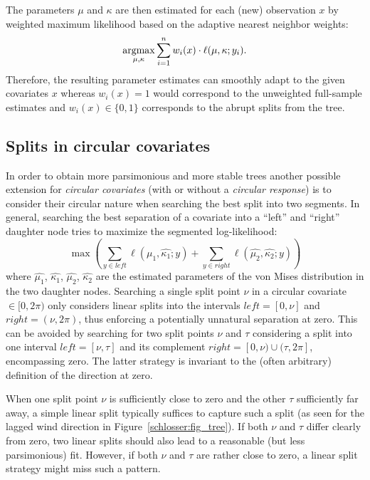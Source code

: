 \documentclass[twoside]{report}
\begin{document}
The parameters $\mu$ and $\kappa$ are then estimated for each (new) 
observation $x$ by weighted maximum likelihood based on the
adaptive nearest neighbor weights:
\begin{equation}
\operatorname{argmax}\displaylimits_{\mu, \kappa} \sum_{i=1}^n w_i(x) \cdot \ell(\mu, \kappa; y_i). 
\end{equation}
Therefore, the resulting parameter estimates can smoothly adapt to the given
covariates $x$ whereas $w_i(x) = 1$ would correspond to the unweighted
full-sample estimates and $w_i(x) \in \{0, 1\}$ corresponds to the abrupt
splits from the tree.

\subsection{Splits in circular covariates}

In order to obtain more parsimonious and more stable trees another possible
extension for \emph{circular covariates} (with or without a \emph{circular response})
is to consider their circular nature when searching the best split into two segments.
In general, searching the best separation of a covariate into a ``left'' and ``right''
daughter node tries to maximize the segmented log-likelihood:
\begin{equation}
\max \left(\sum_{y \in \mathit{left}} \ell(\hat{\mu_1}, \hat{\kappa_1}; y) + \sum_{y \in \mathit{right}} \ell(\hat{\mu_2}, \hat{\kappa_2}; y)\right)
\end{equation}
where $\hat{\mu_1}$, $\hat{\kappa_1}$, $\hat{\mu_2}$, $\hat{\kappa_2}$ are the estimated parameters
of the von Mises distribution in the two daughter nodes. Searching a single split point $\nu$ in a circular covariate $\in [0, 2 \pi)$
only considers linear splits into the intervals $\mathit{left}=[0,\nu]$ and $\mathit{right}=(\nu,2\pi)$,
thus enforcing a potentially unnatural separation at zero. This can be avoided by searching
for two split points $\nu$ and $\tau$ considering a split into one interval $\mathit{left}=[\nu,\tau]$
and its complement $\mathit{right}=[0,\nu) \cup (\tau,2\pi]$, encompassing zero. The latter
strategy is invariant to the (often arbitrary) definition of the direction at zero.

When one split point $\nu$ is sufficiently close to zero and the other $\tau$ sufficiently
far away, a simple linear split typically suffices to capture such a split (as seen for the
lagged wind direction in Figure~\ref{schlosser:fig_tree}). If both $\nu$ and $\tau$ differ
clearly from zero, two linear splits should also lead to a reasonable (but less parsimonious)
fit. However, if both $\nu$ and $\tau$ are rather close to zero, a linear split strategy
might miss such a pattern.
\end{document}
